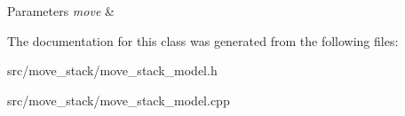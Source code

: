 \begin{DoxyParams}{Parameters}
{\em move} & \\
\hline
\end{DoxyParams}


The documentation for this class was generated from the following files\+:\begin{DoxyCompactItemize}
\item 
src/move\+\_\+stack/move\+\_\+stack\+\_\+model.\+h\item 
src/move\+\_\+stack/move\+\_\+stack\+\_\+model.\+cpp\end{DoxyCompactItemize}
